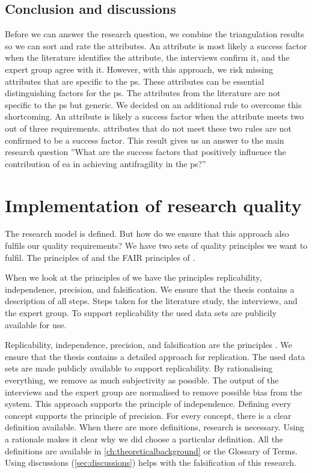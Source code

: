 \subsection{Conclusion and discussions}
\label{sub:conclusionanddiscussions}
Before we can answer the research question, we combine the \gls{triangulation} results so we can sort and rate the \glspl{attribute}. An \gls{attribute} is most likely a success factor when the literature identifies the \gls{attribute}, the interviews confirm it, and the expert group agree with it. However, with this approach, we risk missing \glspl{attribute} that are specific to the \gls{ps}. These \glspl{attribute} can be essential distinguishing factors for the \gls{ps}. The \glspl{attribute} from the literature are not specific to the \gls{ps} but generic. We decided on an additional rule to overcome this shortcoming. An \gls{attribute} is likely a success factor when the \gls{attribute} meets two out of three requirements. \Glspl{attribute} that do not meet these two rules are not confirmed to be a success factor. This result gives us an answer to the main research question ''What are the success factors that positively influence the contribution of \acrlong{ea} in achieving \gls{antifragility} in the \gls{ps}?'' 

\section{Implementation of research quality}
\label{sec:researchqualityimplementation}
The research model is defined. But how do we ensure that this approach also fulfils our quality requirements? We have two sets of quality principles we want to fulfil. The principles of \textcite{Recker2012} and the FAIR principles of \textcite{GOFAIR2017}.

When we look at the principles of \textcite[pp.~15--17]{Recker2012} we have the principles replicability, independence, precision, and falsification. We ensure that the thesis contains a description of all steps. Steps taken for the literature study, the interviews, and the expert group.  To support replicability the used data sets are publicily available for use.

Replicability, independence, precision, and falsification are the principles \parencite[pp.~15--17]{Recker2012}. We ensure that the thesis contains a detailed approach for replication. The used data sets are made publicly available to support replicability. By rationalising everything, we remove as much subjectivity as possible. The output of the interviews and the expert group are normalised to remove possible bias from the system. This approach supports the principle of independence. Defining every concept supports the principle of precision. For every concept, there is a clear definition available. When there are more definitions, research is necessary. Using a rationale makes it clear why we did choose a particular definition. All the definitions are available in \cref{ch:theoreticalbackground} or the Glossary of Terms. Using discussions (\cref{sec:discussions}) helps with the falsification of this research.

